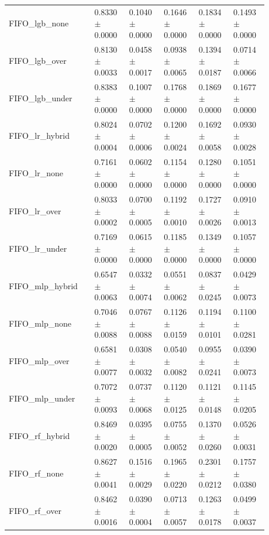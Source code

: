 \begin{longtable}{p{0.28\linewidth}p{0.12\linewidth}p{0.12\linewidth}p{0.12\linewidth}p{0.12\linewidth}p{0.12\linewidth}}
FIFO\_\allowbreak{}lgb\_\allowbreak{}none & 0.8330\(\pm\)0.0000 & 0.1040\(\pm\)0.0000 & 0.1646\(\pm\)0.0000 & 0.1834\(\pm\)0.0000 & 0.1493\(\pm\)0.0000 \\
FIFO\_\allowbreak{}lgb\_\allowbreak{}over & 0.8130\(\pm\)0.0033 & 0.0458\(\pm\)0.0017 & 0.0938\(\pm\)0.0065 & 0.1394\(\pm\)0.0187 & 0.0714\(\pm\)0.0066 \\
FIFO\_\allowbreak{}lgb\_\allowbreak{}under & 0.8383\(\pm\)0.0000 & 0.1007\(\pm\)0.0000 & 0.1768\(\pm\)0.0000 & 0.1869\(\pm\)0.0000 & 0.1677\(\pm\)0.0000 \\
FIFO\_\allowbreak{}lr\_\allowbreak{}hybrid & 0.8024\(\pm\)0.0004 & 0.0702\(\pm\)0.0006 & 0.1200\(\pm\)0.0024 & 0.1692\(\pm\)0.0058 & 0.0930\(\pm\)0.0028 \\
FIFO\_\allowbreak{}lr\_\allowbreak{}none & 0.7161\(\pm\)0.0000 & 0.0602\(\pm\)0.0000 & 0.1154\(\pm\)0.0000 & 0.1280\(\pm\)0.0000 & 0.1051\(\pm\)0.0000 \\
FIFO\_\allowbreak{}lr\_\allowbreak{}over & 0.8033\(\pm\)0.0002 & 0.0700\(\pm\)0.0005 & 0.1192\(\pm\)0.0010 & 0.1727\(\pm\)0.0026 & 0.0910\(\pm\)0.0013 \\
FIFO\_\allowbreak{}lr\_\allowbreak{}under & 0.7169\(\pm\)0.0000 & 0.0615\(\pm\)0.0000 & 0.1185\(\pm\)0.0000 & 0.1349\(\pm\)0.0000 & 0.1057\(\pm\)0.0000 \\
FIFO\_\allowbreak{}mlp\_\allowbreak{}hybrid & 0.6547\(\pm\)0.0063 & 0.0332\(\pm\)0.0074 & 0.0551\(\pm\)0.0062 & 0.0837\(\pm\)0.0245 & 0.0429\(\pm\)0.0073 \\
FIFO\_\allowbreak{}mlp\_\allowbreak{}none & 0.7046\(\pm\)0.0088 & 0.0767\(\pm\)0.0088 & 0.1126\(\pm\)0.0159 & 0.1194\(\pm\)0.0101 & 0.1100\(\pm\)0.0281 \\
FIFO\_\allowbreak{}mlp\_\allowbreak{}over & 0.6581\(\pm\)0.0077 & 0.0308\(\pm\)0.0032 & 0.0540\(\pm\)0.0082 & 0.0955\(\pm\)0.0241 & 0.0390\(\pm\)0.0073 \\
FIFO\_\allowbreak{}mlp\_\allowbreak{}under & 0.7072\(\pm\)0.0093 & 0.0737\(\pm\)0.0068 & 0.1120\(\pm\)0.0125 & 0.1121\(\pm\)0.0148 & 0.1145\(\pm\)0.0205 \\
FIFO\_\allowbreak{}rf\_\allowbreak{}hybrid & 0.8469\(\pm\)0.0020 & 0.0395\(\pm\)0.0005 & 0.0755\(\pm\)0.0052 & 0.1370\(\pm\)0.0260 & 0.0526\(\pm\)0.0031 \\
FIFO\_\allowbreak{}rf\_\allowbreak{}none & 0.8627\(\pm\)0.0041 & 0.1516\(\pm\)0.0029 & 0.1965\(\pm\)0.0220 & 0.2301\(\pm\)0.0212 & 0.1757\(\pm\)0.0380 \\
FIFO\_\allowbreak{}rf\_\allowbreak{}over & 0.8462\(\pm\)0.0016 & 0.0390\(\pm\)0.0004 & 0.0713\(\pm\)0.0057 & 0.1263\(\pm\)0.0178 & 0.0499\(\pm\)0.0037 \\

\end{longtable}
